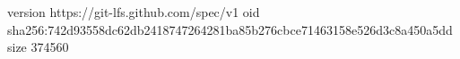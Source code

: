 version https://git-lfs.github.com/spec/v1
oid sha256:742d93558dc62db2418747264281ba85b276cbce71463158e526d3c8a450a5dd
size 374560
